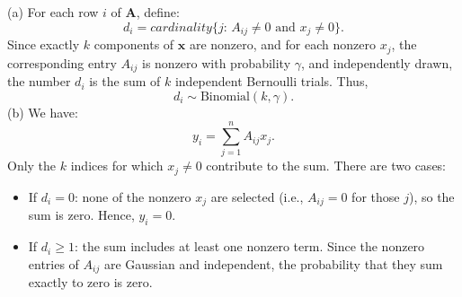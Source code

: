 \documentclass{article}
\begin{document}
\\
\\
(a) For each row \(i\) of \(\boldsymbol{A}\), define:
\[
d_i = cardinality\{j: \, A_{ij} \neq 0 \text{ and } x_j \neq 0\}.
\]
Since exactly \(k\) components of \(\boldsymbol{x}\) are nonzero, and for each nonzero \(x_j\), the corresponding entry \(A_{ij}\) is nonzero with probability \(\gamma\), and independently drawn, the number \(d_i\) is the sum of \(k\) independent Bernoulli trials. Thus,
\[
d_i \sim \text{Binomial}(k,\gamma).
\]
(b) We have:
\[
y_i = \sum_{j=1}^n A_{ij} x_j.
\]
Only the \(k\) indices for which \(x_j \neq 0\) contribute to the sum. There are two cases:

\begin{itemize}
    \item If \(d_i = 0\): none of the nonzero \(x_j\) are selected (i.e., \(A_{ij} = 0\) for those \(j\)), so the sum is zero. Hence, \(y_i = 0\).
    \item If \(d_i \geq 1\): the sum includes at least one nonzero term. Since the nonzero entries of \(A_{ij}\) are Gaussian and independent, the probability that they sum exactly to zero is zero.
\end{itemize}
\end{document}

